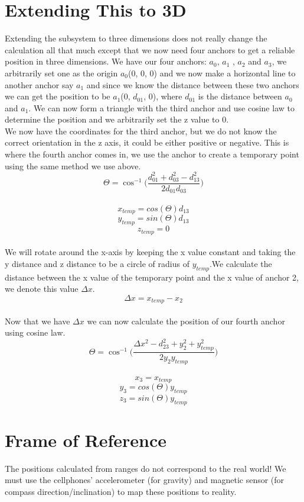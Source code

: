 \section{Extending This to 3D}
Extending the subsystem to three dimensions does not really change the calculation all that much except that we now need four anchors to get a reliable position in three dimensions. We have our four anchors: $a_{0}$, $a_{1}$ , $a_{2}$ and $a_{3}$, we arbitrarily set one as the origin $a_{0}$(0, 0, 0) and we now make a horizontal line to another anchor say $a_{1}$ and since we know the distance between these two anchors we can get the position to be $a_{1}$(0, $d_{01}$, 0), where $d_{01}$ is the distance between $a_{0}$ and $a_{1}$. We can now form a triangle with the third anchor and use cosine law to determine the position and we arbitrarily set the z value to 0.
\\
We now have the coordinates for the third anchor, but we do not know the correct orientation in the z axis, it could be either positive or negative. This is where the fourth anchor comes in, we use the anchor to create a temporary point using the same method we use above.
\\
\[ \Theta = \cos ^{ - 1}\Big(\frac{d_{01}^2 + d_{03}^2 - d_{13}^2 }{2 d_{01} d_{03}}\Big)\]
\\
\[ x_{temp} = cos(\Theta) d_{13} \]
\[ y_{temp} = sin(\Theta) d_{13} \]
\[ z_{temp} = 0 \]
\\
We will rotate around the x-axis by keeping the x value constant and taking the y distance and z distance to be a circle of radius of $y_{temp}$.We calculate the distance between the x value of the temporary point and the x value of anchor 2, we denote this value $\Delta x$.
\\
\[ \Delta x = x_{temp} - x_{2} \]
\\
Now that we have $\Delta x$ we can now calculate the position of our fourth anchor using cosine law.
\\
\[\Theta = \cos ^{ - 1}\Big(\frac {\Delta x^2 - d_{23}^2 + y_{2}^2 + y_{temp}^2}{2 y_{2} y_{temp}}\Big)\]
\\
\[ x_{3} = x_{temp} \]
\[ y_{3} = cos(\Theta) y_{temp} \]
\[ z_{3} = sin(\Theta) y_{temp} \]


\section{Frame of Reference}
\label{FrameOfReference}
The positions calculated from ranges do not correspond to the real world! We must use the cellphones' accelerometer (for gravity) and magnetic sensor (for compass direction/inclination) to map these positions to reality.

